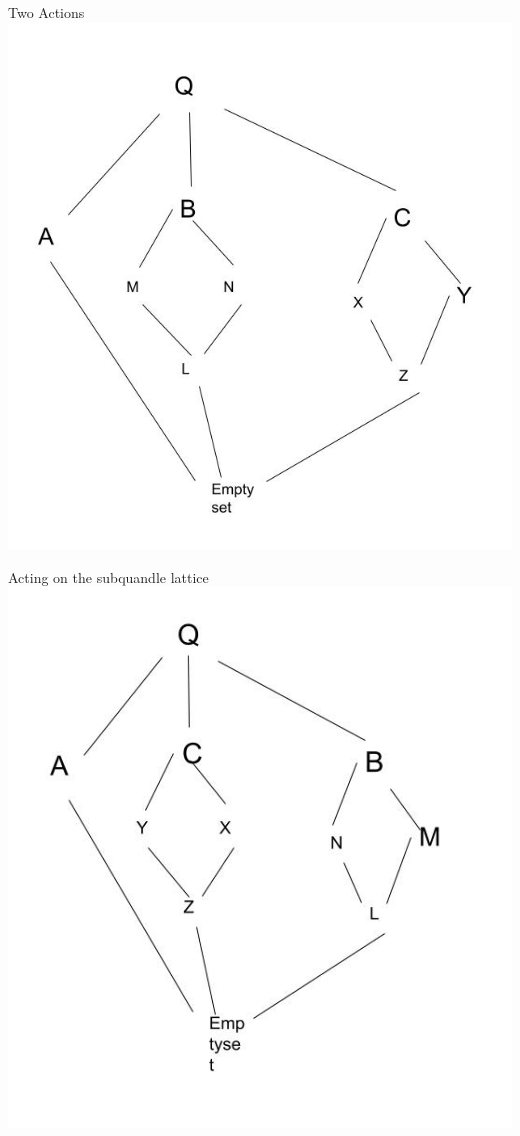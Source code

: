 \documentclass[10pt]{beamer}
\theoremstyle{plain}
\begin{document}
    \begin{frame}{Two Actions}
        \includegraphics[scale = 0.35]{figures/sqlattice.jpg}
        \end{frame}
        
        \begin{frame}{Acting on the subquandle lattice}
        \includegraphics[scale = 0.35]{figures/other_sqlattice.jpg}
        \end{frame}
        
\end{document}
